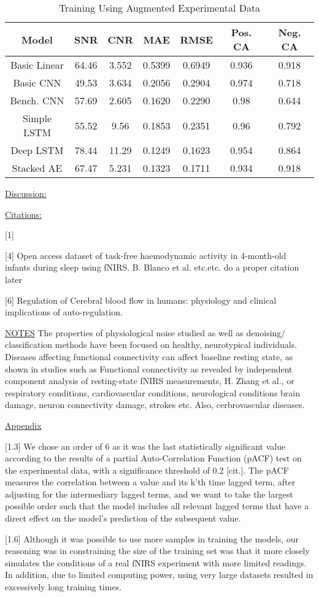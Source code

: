 \documentclass[9pt]{article}
\begin{document}
\begin{table}[h]
\centering
\begin{tabular}{|c|c|c|c|c|c|c|}
\hline
Model & SNR & CNR & MAE & RMSE & Pos. CA & Neg. CA \\
\hline
Basic Linear &64.46&3.552&0.5399&0.6949&0.936&0.918\\
Basic CNN &49.53&3.634&0.2056&0.2904&0.974&0.718\\
Bench. CNN &57.69&2.605&0.1620&0.2290&0.98&0.644\\
Simple LSTM &55.52&9.56&0.1853&0.2351&0.96&0.792\\
Deep LSTM &78.44&11.29&0.1249&0.1623&0.954&0.864\\
Stacked AE &67.47&5.231&0.1323&0.1711&0.934&0.918\\
\end{tabular}
\caption{Training Using Augmented Experimental Data}
\end{table}
\vspace{10cm}

\underline{Discussion:}

\underline{Citations:}

[1] 

[4] Open access dataset of task-free haemodynamic activity in 4-month-old infants during sleep using fNIRS. B. Blanco et al. etc.etc. do a proper citation later

[6] Regulation of Cerebral blood flow in humans: physiology and clinical implications of auto-regulation.

\underline{NOTES}
The properties of physiological noise studied as well as denoising/ classification methods have been focused on healthy, neurotypical individuals. Diseases affecting functional connectivity can affect baseline resting state, as shown in studies such as {Functional connectivity as revealed by independent component analysis of resting-state fNIRS measurements, H. Zhang et al.}, or respiratory conditions, cardiovascular conditions, neurological conditions {brain damage, neuron connectivity damage, strokes} etc. Also, cerbrovascular diseases.

\underline{Appendix}

[1.3] We chose an order of 6 as it was the last statistically significant value according to the results of a partial Auto-Correlation Function (pACF) test on the experimental data, with a significance threshold of 0.2 [cit.]. The pACF measures the correlation between a value and its k'th time lagged term, after adjusting for the intermediary lagged terms, and we want to take the largest possible order such that the model includes all relevant lagged terms that have a direct effect on the model's prediction of the subsequent value.


[1.6] Although it was possible to use more samples in training the models, our reasoning was in constraining the size of the training set was that it more closely simulates the conditions of a real fNIRS experiment with more limited readings. In addition, due to limited computing power, using very large datasets resulted in excessively long training times.
\end{document}
